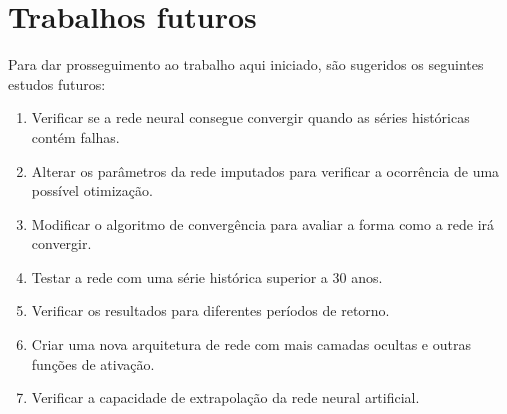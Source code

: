 \section{Trabalhos futuros}

Para dar prosseguimento ao trabalho aqui iniciado, são sugeridos os seguintes estudos futuros:

\begin{enumerate}
    \item Verificar se a rede neural consegue convergir quando as séries históricas contém falhas.
    \item Alterar os parâmetros da rede imputados para verificar a ocorrência de uma possível otimização.
    \item Modificar o algoritmo de convergência para avaliar a forma como a rede irá convergir.
    \item Testar a rede com uma série histórica superior a 30 anos.
    \item Verificar os resultados para diferentes períodos de retorno.
    \item Criar uma nova arquitetura de rede com mais camadas ocultas e outras funções de ativação.
    \item Verificar a capacidade de extrapolação da rede neural artificial.
\end{enumerate}